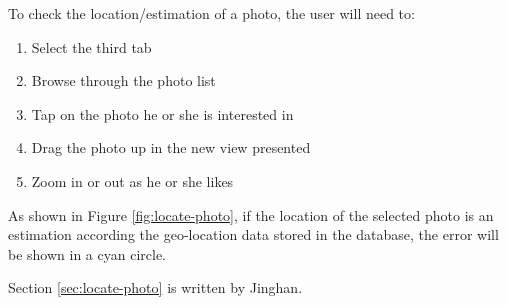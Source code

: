 \documentclass[12pt,a4paper]{article}
\begin{document}
            To check the location/estimation of a photo, the user will need to:
            \begin{enumerate}
                \item Select the third tab
                \item Browse through the photo list
                \item Tap on the photo he or she is interested in
                \item Drag the photo up in the new view presented
                \item Zoom in or out as he or she likes
            \end{enumerate}
            As shown in Figure \ref{fig:locate-photo}, if the location of the selected photo is an estimation according the geo-location data stored in the database, the error will be shown in a cyan circle. 
            
            \footnotesize
            Section \ref{sec:locate-photo} is written by Jinghan.
            \normalsize
        
        
\end{document}
